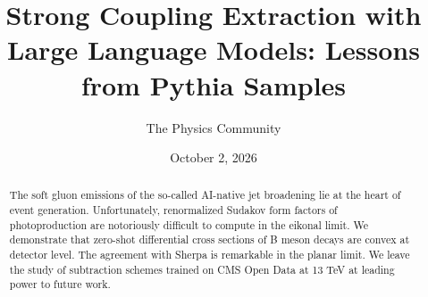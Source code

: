 \documentclass[11pt]{article}
\title{Strong Coupling Extraction with Large Language Models: Lessons from Pythia Samples}
\author{The Physics Community}
\date{October 2, 2026}
\numberwithin{equation}{section}
\theoremstyle{definition}
\theoremstyle{remark}
\begin{document}
\maketitle
\begin{abstract}
The soft gluon emissions of the so-called AI-native jet broadening lie
at the heart of event generation. Unfortunately, renormalized Sudakov
form factors of photoproduction are notoriously difficult to compute in
the eikonal limit. We demonstrate that zero-shot differential cross
sections of B meson decays are convex at detector level. The agreement
with Sherpa is remarkable in the planar limit. We leave the study of
subtraction schemes trained on CMS Open Data at 13 TeV at leading power
to future work.
\end{abstract}
\tableofcontents




\nocite{*}


\end{document}
